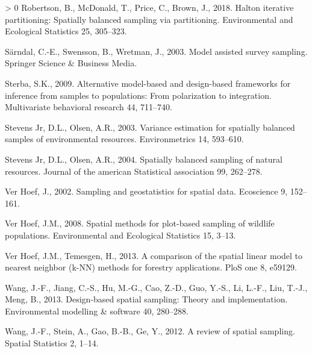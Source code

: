 \documentclass[]{elsarticle} %
\newlength{\cslhangindent}
\newenvironment{CSLReferences}[3] %
 {%
  \setlength{\parindent}{0pt}
  \ifodd #1 \everypar{\setlength{\hangindent}{\cslhangindent}}\ignorespaces\fi
  \ifnum #2 > 0
  \setlength{\parskip}{#2\baselineskip}
  \fi
 }%
 {}
\begin{document}
\begin{CSLReferences}{1}{0}
\leavevmode\hypertarget{ref-robertson2018halton}{}%
Robertson, B., McDonald, T., Price, C., Brown, J., 2018. Halton
iterative partitioning: Spatially balanced sampling via partitioning.
Environmental and Ecological Statistics 25, 305--323.

\leavevmode\hypertarget{ref-sarndal2003model}{}%
Särndal, C.-E., Swensson, B., Wretman, J., 2003. Model assisted survey
sampling. Springer Science \& Business Media.

\leavevmode\hypertarget{ref-sterba2009alternative}{}%
Sterba, S.K., 2009. Alternative model-based and design-based frameworks
for inference from samples to populations: From polarization to
integration. Multivariate behavioral research 44, 711--740.

\leavevmode\hypertarget{ref-stevens2003variance}{}%
Stevens Jr, D.L., Olsen, A.R., 2003. Variance estimation for spatially
balanced samples of environmental resources. Environmetrics 14,
593--610.

\leavevmode\hypertarget{ref-stevens2004spatially}{}%
Stevens Jr, D.L., Olsen, A.R., 2004. Spatially balanced sampling of
natural resources. Journal of the american Statistical association 99,
262--278.

\leavevmode\hypertarget{ref-verhoef2002sampling}{}%
Ver Hoef, J., 2002. Sampling and geostatistics for spatial data.
Ecoscience 9, 152--161.

\leavevmode\hypertarget{ref-verhoef2008spatial}{}%
Ver Hoef, J.M., 2008. Spatial methods for plot-based sampling of
wildlife populations. Environmental and Ecological Statistics 15, 3--13.

\leavevmode\hypertarget{ref-ver2013comparison}{}%
Ver Hoef, J.M., Temesgen, H., 2013. A comparison of the spatial linear
model to nearest neighbor (k-NN) methods for forestry applications. PloS
one 8, e59129.

\leavevmode\hypertarget{ref-wang2013design}{}%
Wang, J.-F., Jiang, C.-S., Hu, M.-G., Cao, Z.-D., Guo, Y.-S., Li, L.-F.,
Liu, T.-J., Meng, B., 2013. Design-based spatial sampling: Theory and
implementation. Environmental modelling \& software 40, 280--288.

\leavevmode\hypertarget{ref-wang2012review}{}%
Wang, J.-F., Stein, A., Gao, B.-B., Ge, Y., 2012. A review of spatial
sampling. Spatial Statistics 2, 1--14.

\end{CSLReferences}
\end{document}
